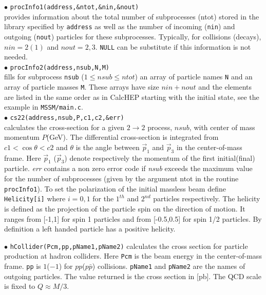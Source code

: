 \documentclass[12pt,a4paper]{article}
\begin{document}
\noindent
$\bullet$ \verb|procInfo1(address,&ntot,&nin,&nout)|\\
provides information  about the total number of subprocesses
(ntot) stored in the library  specified by {\tt address} as well
as the number of incoming (\verb|nin|) and outgoing (\verb|nout|) particles for
these subprocesses. Typically, for collisions (decays), $nin=2(1)$ and $nout=2,3$.
\verb|NULL| can be substitute if this information is not needed. \\
$\bullet$ \verb|procInfo2(address,nsub,N,M)|\\
fills for subprocess \verb|nsub| ($1\leq nsub \leq ntot$) an array of
particle names \verb|N| and an array of particle  masses \verb|M|. These
arrays have size $nin+nout$ and the elements are listed in the same order
as in CalcHEP starting with the initial state, see the example in 
\verb|MSSM/main.c|.\\



\noindent
$\bullet$ \verb|cs22(address,nsub,P,c1,c2,&err)|\\
calculates  the cross-section for a given $2\rightarrow 2$
process, $nsub$, with  center of mass momentum $P$(GeV). The
differential cross-section is integrated
 from  $ c1 < \cos\theta <c2 $  and $\theta$ is
the angle between $\vec{p}_1$ and $\vec{p}_3$  in the
center-of-mass frame. Here $\vec{p}_1$ ($\vec{p}_3$) denote
respectively the momentum of the first initial(final) particle.
{\it err} contains a non zero error code if {\it nsub} exceeds the
maximum value  for the number of subprocesses (given by the
argument ntot in the routine {\tt procInfo1}). To set the polarization 
of the initial massless beam define   \verb|Helicity[i]|  where $i=0,1$ 
for the $1^{th}$ and $2^{nd}$ particles respectively.
The   helicity is defined as the projection of the particle spin
on the direction of motion. It ranges from  [-1,1] for spin 1 particles and 
from [-0.5,0.5]  for spin 1/2 particles.
By definition a left handed particle has a positive
helicity. 


\noindent$\bullet$ \verb|hCollider(Pcm,pp,pName1,pName2)| calculates the cross
section for particle production at hadron colliders. Here \verb|Pcm| 
is the beam energy  in the center-of-mass frame. \verb|pp| is
$1$($-1$) for $pp$($p\bar{p}$) collisions. 
{\tt pName1} and {\tt pName2} are the names of outgoing
particles. The value returned  is the cross section in [pb]. 
The QCD scale is fixed to $Q\approx M/3$.
\end{document}
